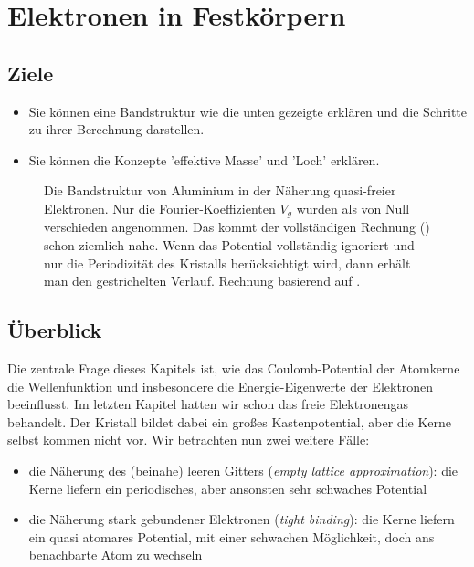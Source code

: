 \renewcommand{\chapterauthors}{Markus Lippitz}
\renewcommand{\lastmod}{20. März  2025}

\chapter{Elektronen in Festkörpern}
\label{chap:bandstruktur}




\section{Ziele}
 


\begin{itemize}  
\item Sie können eine Bandstruktur wie die unten gezeigte erklären und die Schritte zu ihrer Berechnung darstellen. 
\item Sie können die Konzepte 'effektive Masse' und 'Loch' erklären.
\end{itemize}


\begin{figure}
    \caption{Die Bandstruktur von Aluminium in der Näherung quasi-freier Elektronen. Nur die Fourier-Koeffizienten $V_g$ wurden als von Null verschieden angenommen.  Das kommt der vollständigen Rechnung (\cite{Segall1961}) schon ziemlich nahe. Wenn das Potential vollständig ignoriert und nur die Periodizität des Kristalls berücksichtigt wird, dann erhält man den gestrichelten Verlauf. Rechnung basierend auf \cite{Polakovic_cmpm3}. \label{fig:3_al_empty_lattice}}
\end{figure} 
  

\section{Überblick}

Die zentrale Frage dieses Kapitels ist, wie das Coulomb-Potential der Atomkerne die Wellenfunktion und insbesondere die Energie-Eigenwerte der Elektronen beeinflusst. Im letzten Kapitel hatten wir schon das freie Elektronengas behandelt. Der Kristall bildet dabei ein großes Kastenpotential, aber die Kerne selbst kommen nicht vor.
Wir betrachten nun zwei weitere Fälle: 
\begin{itemize}
    \item die Näherung des (beinahe) leeren Gitters (\textit{empty lattice approximation}): die Kerne liefern ein periodisches, aber ansonsten sehr schwaches Potential
    \item die Näherung stark gebundener Elektronen (\textit{tight binding}): die Kerne liefern ein quasi atomares Potential, mit einer schwachen Möglichkeit, doch ans benachbarte Atom zu wechseln
\end{itemize}

